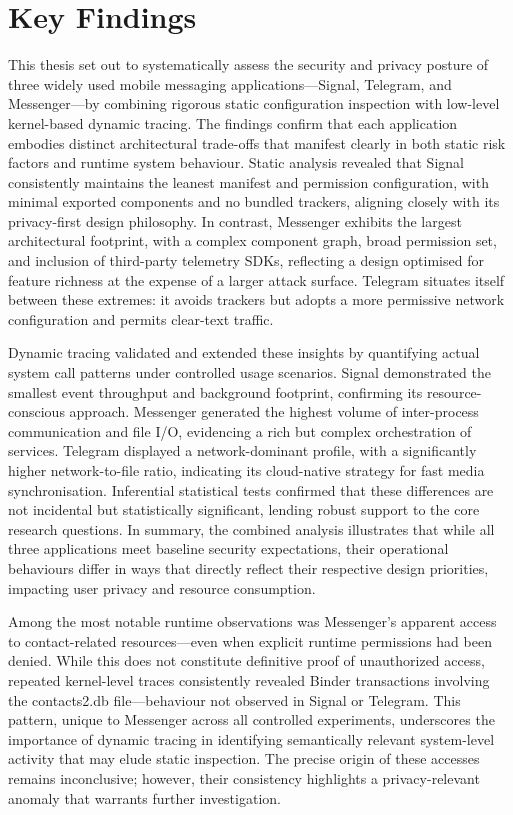 \documentclass[a4paper,12pt]{report}
\begin{document}
\section{Key Findings}
This thesis set out to systematically assess the security and privacy posture of three widely used mobile messaging applications—Signal, Telegram, and Messenger—by combining rigorous static configuration inspection with low-level kernel-based dynamic tracing. The findings confirm that each application embodies distinct architectural trade-offs that manifest clearly in both static risk factors and runtime system behaviour. Static analysis revealed that Signal consistently maintains the leanest manifest and permission configuration, with minimal exported components and no bundled trackers, aligning closely with its privacy-first design philosophy. In contrast, Messenger exhibits the largest architectural footprint, with a complex component graph, broad permission set, and inclusion of third-party telemetry SDKs, reflecting a design optimised for feature richness at the expense of a larger attack surface. Telegram situates itself between these extremes: it avoids trackers but adopts a more permissive network configuration and permits clear-text traffic.

Dynamic tracing validated and extended these insights by quantifying actual system call patterns under controlled usage scenarios. Signal demonstrated the smallest event throughput and background footprint, confirming its resource-conscious approach. Messenger generated the highest volume of inter-process communication and file I/O, evidencing a rich but complex orchestration of services. Telegram displayed a network-dominant profile, with a significantly higher network-to-file ratio, indicating its cloud-native strategy for fast media synchronisation. Inferential statistical tests confirmed that these differences are not incidental but statistically significant, lending robust support to the core research questions. In summary, the combined analysis illustrates that while all three applications meet baseline security expectations, their operational behaviours differ in ways that directly reflect their respective design priorities, impacting user privacy and resource consumption.

Among the most notable runtime observations was Messenger’s apparent access to contact-related resources—even when explicit runtime permissions had been denied. While this does not constitute definitive proof of unauthorized access, repeated kernel-level traces consistently revealed Binder transactions involving the contacts2.db file—behaviour not observed in Signal or Telegram. This pattern, unique to Messenger across all controlled experiments, underscores the importance of dynamic tracing in identifying semantically relevant system-level activity that may elude static inspection. The precise origin of these accesses remains inconclusive; however, their consistency highlights a privacy-relevant anomaly that warrants further investigation.%
\end{document}
